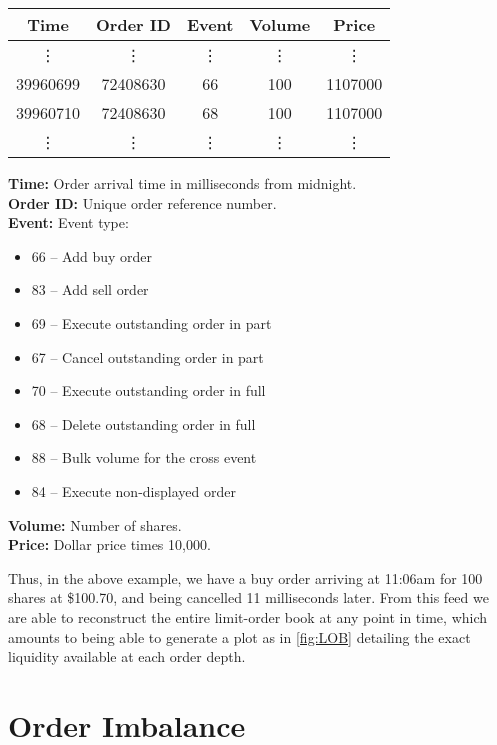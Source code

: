 \begin{table}[H]
\centering
{}
\begin{tabular}{@{} *{5}{c} @{}}
\toprule
Time & Order ID & Event & Volume & Price \\
\midrule
\vdots & \vdots & \vdots & \vdots & \vdots \\
39960699 &72408630 & 66 & 100 & 1107000 \\
39960710 & 72408630 & 68 & 100 & 1107000 \\
\vdots & \vdots & \vdots & \vdots & \vdots \\
\bottomrule
\end{tabular}
\label{tbl:ITCHevents}
\end{table}
{\bf Time:} Order arrival time in milliseconds from midnight. \\
{\bf Order ID:} Unique order reference number. \\
{\bf Event:} Event type:
\vspace{-\topsep}
\begin{itemize}[label={},nolistsep]
\item 66 -- Add buy order
\item 83 -- Add sell order
\item 69 -- Execute outstanding order in part
\item 67 -- Cancel outstanding order in part
\item 70 -- Execute outstanding order in full
\item 68 -- Delete outstanding order in full
\item 88 -- Bulk volume for the cross event
\item 84 -- Execute non-displayed order
\end{itemize}
\vspace{-\topsep}
{\bf Volume:} Number of shares. \\
{\bf Price:} Dollar price times 10,000. \par  
Thus, in the above example, we have a buy order arriving at 11:06am for 100 shares at \$100.70, and being cancelled 11 milliseconds later. From this feed we are able to reconstruct the entire limit-order book at any point in time, which amounts to being able to generate a plot as in \autoref{fig:LOB} detailing the exact liquidity available at each order depth.

\section{Order Imbalance}

